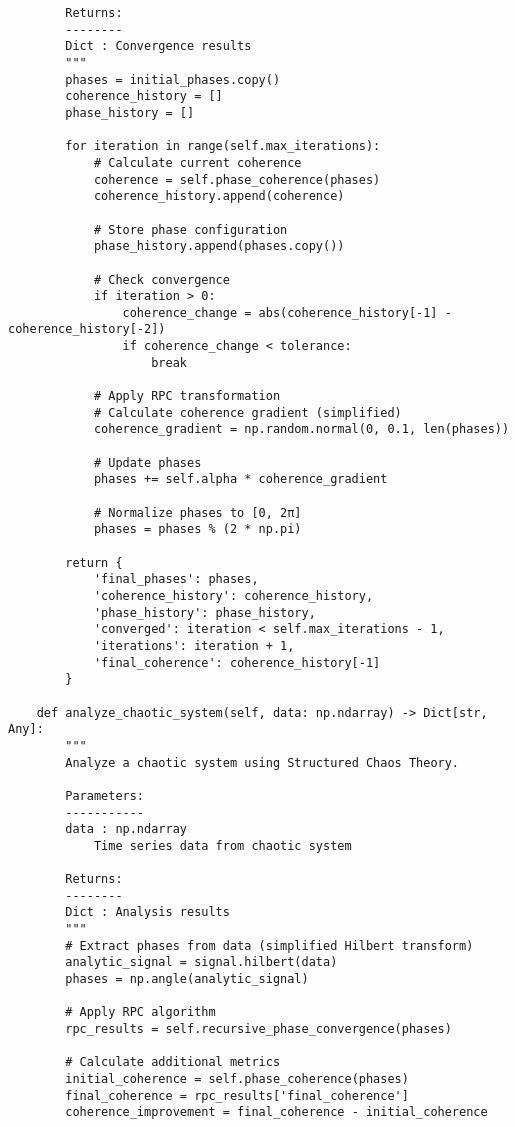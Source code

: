 \documentclass[12pt]{article}
\begin{document}
\begin{lstlisting}
        Returns:
        --------
        Dict : Convergence results
        """
        phases = initial_phases.copy()
        coherence_history = []
        phase_history = []

        for iteration in range(self.max_iterations):
            # Calculate current coherence
            coherence = self.phase_coherence(phases)
            coherence_history.append(coherence)

            # Store phase configuration
            phase_history.append(phases.copy())

            # Check convergence
            if iteration > 0:
                coherence_change = abs(coherence_history[-1] - coherence_history[-2])
                if coherence_change < tolerance:
                    break

            # Apply RPC transformation
            # Calculate coherence gradient (simplified)
            coherence_gradient = np.random.normal(0, 0.1, len(phases))

            # Update phases
            phases += self.alpha * coherence_gradient

            # Normalize phases to [0, 2π]
            phases = phases % (2 * np.pi)

        return {
            'final_phases': phases,
            'coherence_history': coherence_history,
            'phase_history': phase_history,
            'converged': iteration < self.max_iterations - 1,
            'iterations': iteration + 1,
            'final_coherence': coherence_history[-1]
        }

    def analyze_chaotic_system(self, data: np.ndarray) -> Dict[str, Any]:
        """
        Analyze a chaotic system using Structured Chaos Theory.

        Parameters:
        -----------
        data : np.ndarray
            Time series data from chaotic system

        Returns:
        --------
        Dict : Analysis results
        """
        # Extract phases from data (simplified Hilbert transform)
        analytic_signal = signal.hilbert(data)
        phases = np.angle(analytic_signal)

        # Apply RPC algorithm
        rpc_results = self.recursive_phase_convergence(phases)

        # Calculate additional metrics
        initial_coherence = self.phase_coherence(phases)
        final_coherence = rpc_results['final_coherence']
        coherence_improvement = final_coherence - initial_coherence


\end{lstlisting}
\end{document}
